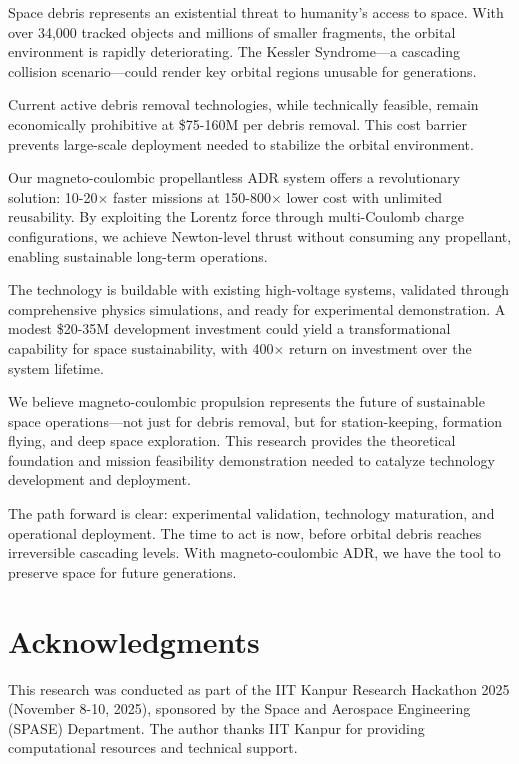 \documentclass[12pt,a4paper]{article}
\begin{document}
Space debris represents an existential threat to humanity's access to space. With over 34,000 tracked objects and millions of smaller fragments, the orbital environment is rapidly deteriorating. The Kessler Syndrome—a cascading collision scenario—could render key orbital regions unusable for generations.

Current active debris removal technologies, while technically feasible, remain economically prohibitive at \$75-160M per debris removal. This cost barrier prevents large-scale deployment needed to stabilize the orbital environment.

Our magneto-coulombic propellantless ADR system offers a revolutionary solution: 10-20$\times$ faster missions at 150-800$\times$ lower cost with unlimited reusability. By exploiting the Lorentz force through multi-Coulomb charge configurations, we achieve Newton-level thrust without consuming any propellant, enabling sustainable long-term operations.

The technology is buildable with existing high-voltage systems, validated through comprehensive physics simulations, and ready for experimental demonstration. A modest \$20-35M development investment could yield a transformational capability for space sustainability, with 400$\times$ return on investment over the system lifetime.

We believe magneto-coulombic propulsion represents the future of sustainable space operations—not just for debris removal, but for station-keeping, formation flying, and deep space exploration. This research provides the theoretical foundation and mission feasibility demonstration needed to catalyze technology development and deployment.

The path forward is clear: experimental validation, technology maturation, and operational deployment. The time to act is now, before orbital debris reaches irreversible cascading levels. With magneto-coulombic ADR, we have the tool to preserve space for future generations.

\section*{Acknowledgments}

This research was conducted as part of the IIT Kanpur Research Hackathon 2025 (November 8-10, 2025), sponsored by the Space and Aerospace Engineering (SPASE) Department. The author thanks IIT Kanpur for providing computational resources and technical support.
\end{document}
